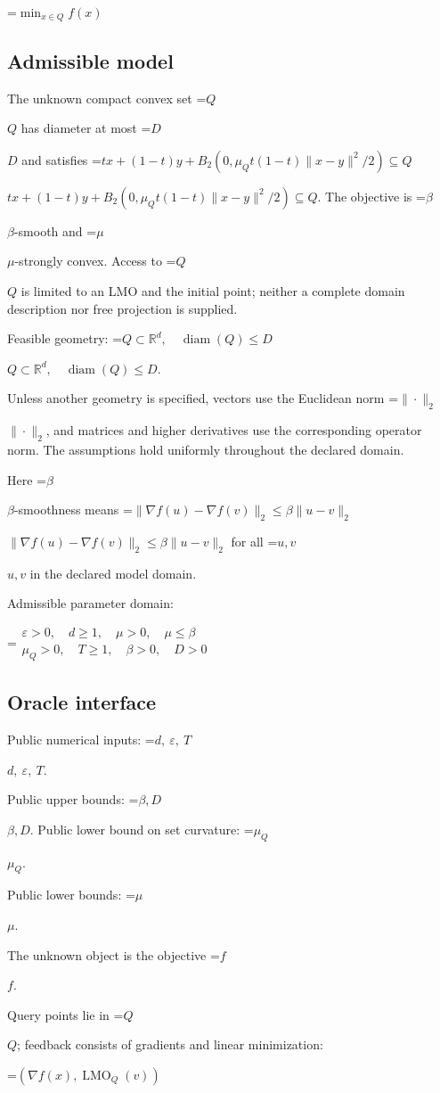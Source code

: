 \documentclass[10pt,a4paper]{article}
\newcommand{\AtlasMath}[1]{\par\begingroup\centering\setbox0=\hbox{$\displaystyle #1$}\ifdim\wd0>1.4\linewidth\typeout{ATLAS WIDE FORMULA: \the\wd0}\fi\ifdim\wd0>\linewidth\resizebox{\linewidth}{!}{\box0}\else\box0\fi\par\endgroup}
\newcommand{\AtlasInlineMath}[1]{\begingroup\setbox0=\hbox{$#1$}\ifdim\wd0>.4\linewidth\endgroup\AtlasMath{#1}\else\endgroup$#1$\fi}
\begin{document}
\AtlasMath{\min_{x\in Q}f(x)}


\subsection{Admissible model}
The unknown compact convex set \AtlasInlineMath{Q} has diameter at most \AtlasInlineMath{D} and satisfies \AtlasInlineMath{tx+(1-t)y+B_2(0,\mu_Qt(1-t)\|x-y\|^2/2)\subseteq Q}. The objective is \AtlasInlineMath{\beta}-smooth and \AtlasInlineMath{\mu}-strongly convex. Access to \AtlasInlineMath{Q} is limited to an LMO and the initial point; neither a complete domain description nor free projection is supplied.

Feasible geometry: \AtlasInlineMath{Q\subset\mathbb{R}^d,\quad\operatorname{diam}(Q)\le D}.

Unless another geometry is specified, vectors use the Euclidean norm \AtlasInlineMath{\|\cdot\|_2}, and matrices and higher derivatives use the corresponding operator norm. The assumptions hold uniformly throughout the declared domain.

Here \AtlasInlineMath{\beta}-smoothness means \AtlasInlineMath{\|\nabla f(u)-\nabla f(v)\|_2\le\beta\|u-v\|_2} for all \AtlasInlineMath{u,v} in the declared model domain.

Admissible parameter domain:


\AtlasMath{\begin{gathered}\varepsilon > 0,\quad d \ge 1,\quad \mu > 0,\quad \mu \le \beta\\\mu_Q > 0,\quad T \ge 1,\quad \beta > 0,\quad D > 0\end{gathered}}


\subsection{Oracle interface}
Public numerical inputs: \AtlasInlineMath{d,\ \varepsilon,\ T}.

Public upper bounds: \AtlasInlineMath{\beta,D}. Public lower bound on set curvature: \AtlasInlineMath{\mu_Q}.

Public lower bounds: \AtlasInlineMath{\mu}.

The unknown object is the objective \AtlasInlineMath{f}.

Query points lie in \AtlasInlineMath{Q}; feedback consists of gradients and linear minimization:


\AtlasMath{(\nabla f(x),\operatorname{LMO}_Q(v))}
\end{document}

